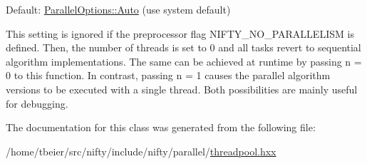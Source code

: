 Default\+: {\ttfamily \hyperlink{classnifty_1_1parallel_1_1ParallelOptions_a7a945e8bd698883de4af0f906b2aa88aa0bd8f9fd00d78fcfdcb6ee1575f43fd6}{Parallel\+Options\+::\+Auto}} (use system default)

This setting is ignored if the preprocessor flag {\ttfamily N\+I\+F\+T\+Y\+\_\+\+N\+O\+\_\+\+P\+A\+R\+A\+L\+L\+E\+L\+I\+S\+M} is defined. Then, the number of threads is set to 0 and all tasks revert to sequential algorithm implementations. The same can be achieved at runtime by passing {\ttfamily n = 0} to this function. In contrast, passing {\ttfamily n = 1} causes the parallel algorithm versions to be executed with a single thread. Both possibilities are mainly useful for debugging. 

The documentation for this class was generated from the following file\+:\begin{DoxyCompactItemize}
\item 
/home/tbeier/src/nifty/include/nifty/parallel/\hyperlink{threadpool_8hxx}{threadpool.\+hxx}\end{DoxyCompactItemize}
